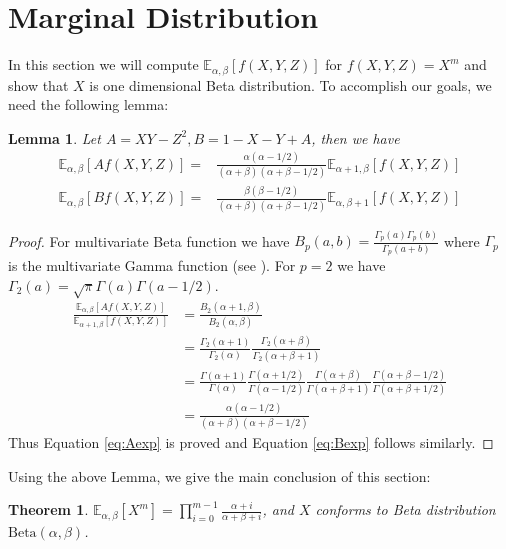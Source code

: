 \documentclass{elsarticle}
\newtheorem{theorem}{Theorem}
\newtheorem{lemma}{Lemma}
\def\E{\mathbb{E}}
\def\Beta{\textrm{Beta}}
\begin{document}
\section{Marginal Distribution}
In this section we will compute $\E_{\alpha,\beta}[f(X,Y, Z)]$
for $f(X,Y,Z)=X^m$ and show that $X$ is one dimensional Beta distribution.
To accomplish our goals, we need the following lemma:
\begin{lemma}\label{lem:AB}
	Let $A = XY - Z^2, B = 1 - X - Y + A$, then we have
	\begin{align}
	\E_{\alpha, \beta}[Af(X,Y,Z)] =&
	\frac{\alpha(\alpha-1/2)}{(\alpha+\beta)(\alpha+\beta-1/2)}\E_{\alpha+1, \beta}[f(X,Y,Z)]
	\label{eq:Aexp} \\
	\E_{\alpha,\beta}[Bf(X,Y,Z)] =&
	\frac{\beta(\beta-1/2)}{(\alpha+\beta)(\alpha+\beta-1/2)}\E_{\alpha, \beta+1}[f(X,Y,Z)]
	\label{eq:Bexp}
	\end{align}
\end{lemma}
\begin{proof}
	For multivariate Beta function we have
	$B_p(a, b) = \frac{\Gamma_p(a)\Gamma_p(b)}{\Gamma_p(a+b)}$
	where $\Gamma_p$ is the multivariate Gamma function (see \cite{ingham_1933}).
	For $p=2$ we have $\Gamma_2(a) = \sqrt{\pi}\Gamma(a)\Gamma(a-1/2)$.
	\begin{align*}
	\frac{\E_{\alpha, \beta}[Af(X,Y,Z)]}{\E_{\alpha+1, \beta}[f(X,Y,Z)]} &
	=\frac{B_2(\alpha+1,\beta)}{B_2(\alpha,\beta)}\\
	&=\frac{\Gamma_2(\alpha+1)}{\Gamma_2(\alpha)}
	\frac{\Gamma_2(\alpha+\beta)}{\Gamma_2(\alpha+\beta+1)}\\
	& =\frac{\Gamma(\alpha+1)}{\Gamma(\alpha)}
	\frac{\Gamma(\alpha+1/2)}{\Gamma(\alpha-1/2)}
	\frac{\Gamma(\alpha+\beta)}{\Gamma(\alpha+\beta+1)}
	\frac{\Gamma(\alpha+\beta-1/2)}{\Gamma(\alpha+\beta+1/2)}\\
	&=\frac{\alpha(\alpha-1/2)}{(\alpha+\beta)(\alpha+\beta-1/2)}
	\end{align*}
	Thus Equation \eqref{eq:Aexp} is proved and Equation \eqref{eq:Bexp} follows similarly.
\end{proof}
Using the above Lemma, we give the main conclusion of this section:
\begin{theorem}\label{thm:Xm}
	$\E_{\alpha, \beta}[X^m] =
	\prod_{i=0}^{m-1}\frac{\alpha+i}{\alpha+\beta+i}$, and $X$
	conforms to Beta distribution $\Beta(\alpha, \beta)$.
\end{theorem}
\end{document}
